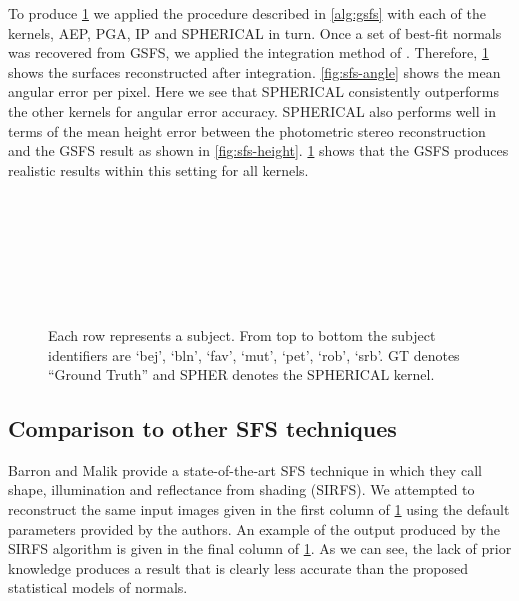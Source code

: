 To produce \cref{fig:sfs-results} we applied the procedure described in 
\cref{alg:gsfs} with each of the kernels, AEP, PGA, IP and SPHERICAL 
in turn. Once a set of best-fit normals was recovered from GSFS, we applied 
the integration method of \citet{frankot1988method}. 
Therefore, \cref{fig:sfs-results} shows the surfaces reconstructed 
after integration. \cref{fig:sfs-angle} shows the mean angular error 
per pixel. Here we see that SPHERICAL consistently outperforms the other 
kernels for angular error accuracy. SPHERICAL also performs well in terms of 
the mean height error between the photometric stereo reconstruction and the 
GSFS result as shown in \cref{fig:sfs-height}. \cref{fig:sfs-results} 
shows that the GSFS produces realistic results within this setting for all kernels.
\begin{figure}
    \centering
     \\
     \\
     \\
     \\
     \\
     \\
    \caption{Each row represents a subject. From top to bottom the subject 
             identifiers are `bej', `bln', `fav', `mut', `pet', `rob', `srb'.
             GT denotes ``Ground Truth'' and SPHER denotes the SPHERICAL 
             kernel.}
\label{fig:sfs-results}
\end{figure}
\subsection{Comparison to other SFS techniques}\label{subsec:sfs-compare}
Barron and Malik provide a state-of-the-art SFS technique in 
\cite{barron2015shape} which they call shape, illumination and 
reflectance from shading (SIRFS). We attempted to reconstruct the same input 
images given in the first column of \cref{fig:sfs-results} using the 
default parameters provided by the authors. An example of the output produced 
by the SIRFS algorithm is given in the final column of \cref{fig:sfs-results}. 
As we can see, the lack of prior knowledge produces a result that is clearly 
less accurate than the proposed statistical models of normals.

